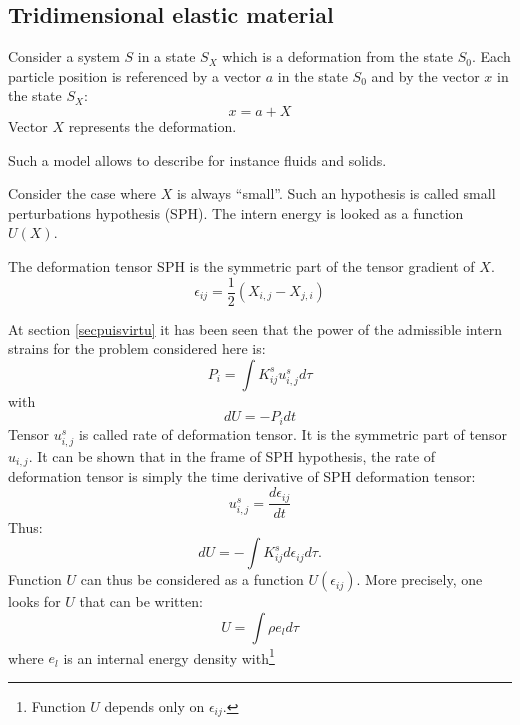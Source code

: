 \documentclass[12pt]{book}
\begin{document}
\subsection{Tridimensional elastic material}\label{secmaterelast}
Consider a system $S$ in a state $S_X$ which is a deformation from the state
$S_0$. Each particle position is referenced by a vector $a$ in the state
$S_0$ and by the vector $x$ in the state $S_X$:
\begin{equation}
x=a+X
\end{equation}
Vector $X$ represents the deformation.
\begin{rem}
Such a model allows to describe for instance fluids and solids.
\end{rem}
Consider the case where $X$ is always ``small''. Such an hypothesis is called
small perturbations hypothesis (SPH). The intern energy is looked as a function
 $U(X)$. 
\begin{defn}
The deformation tensor SPH is the symmetric part of the tensor gradient of $X$.
\begin{equation}
\epsilon_{ij}=\frac{1}{2}(X_{i,j}-X_{j,i})
\end{equation}
\end{defn}
At section \ref{secpuisvirtu} it has been seen that the power of the
admissible intern strains for the problem considered here is:
\begin{equation}
P_i=\int K_{ij}^s u_{i,j}^s d\tau
\end{equation}
with
\begin{equation}
dU=-P_idt
\end{equation}
Tensor $u_{i,j}^s$ is called rate of deformation tensor. It is the symmetric
part of tensor $u_{i,j}$. It can be shown \cite{ph:fluid:Germain80} that in
the frame of SPH hypothesis, the rate of deformation tensor is simply the time
derivative of SPH deformation tensor:
\begin{equation}
u_{i,j}^s=\frac{d\epsilon_{ij}}{dt}
\end{equation}
Thus:
\begin{equation}\label{dukij}
dU=-\int K_{ij}^s d\epsilon_{ij}d\tau.
\end{equation}
Function $U$ can thus be considered as a function $U(\epsilon_{ij})$. More
precisely, one looks for $U$ that can be written:
\begin{equation}
U=\int \rho e_l d\tau
\end{equation}
where $e_l$ is an internal energy density with\footnote{%
Function $U$ depends only on $\epsilon_{ij}$.} %
\end{document}
